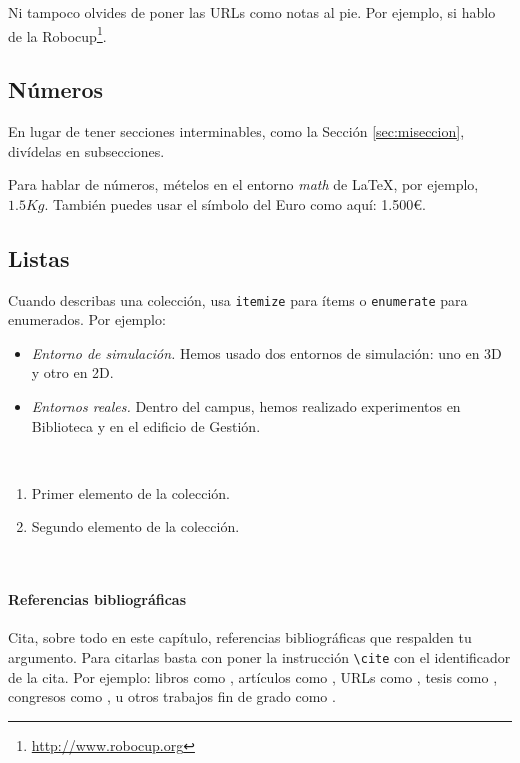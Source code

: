 Ni tampoco olvides de poner las URLs como notas al pie. Por ejemplo, si hablo de la Robocup\footnote{\url{http://www.robocup.org}}.

\subsection{Números}
\label{sec:subseccion}

En lugar de tener secciones interminables, como la Sección \ref{sec:miseccion}, divídelas en subsecciones.

Para hablar de números, mételos en el entorno \textit{math} de \LaTeX, por ejemplo, $1.5Kg$. También puedes usar el símbolo del Euro como aquí: 1.500\euro.

\subsection{Listas}

Cuando describas una colección, usa \texttt{itemize} para ítems o \texttt{enumerate} para enumerados. Por ejemplo:

\begin{itemize}
 \item \textit{Entorno de simulación.} Hemos usado dos entornos de simulación: uno en 3D y otro en 2D.
 \item \textit{Entornos reales.} Dentro del campus, hemos realizado experimentos en Biblioteca y en el edificio de Gestión.
\end{itemize}\

\begin{enumerate}
 \item Primer elemento de la colección.
 \item Segundo elemento de la colección.
\end{enumerate}\

\paragraph{Referencias bibliográficas}
\label{sec:referencias}

Cita, sobre todo en este capítulo, referencias bibliográficas que respalden tu argumento. Para citarlas basta con poner la instrucción \verb|\cite| con el identificador de la cita. Por ejemplo: libros como \cite{vega12e}, artículos como \cite{vega19b}, URLs como \cite{vega19a}, tesis como \cite{vega18b}, congresos como \cite{vega18a}, u otros trabajos fin de grado como \cite{vega08b}.

